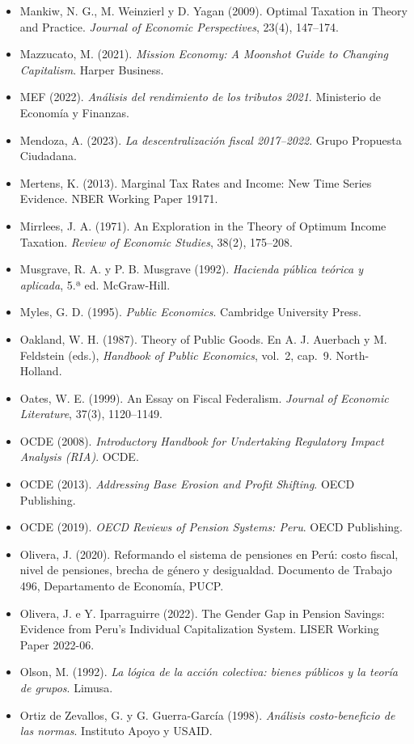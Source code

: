 \documentclass[11pt,a4paper]{article}
\begin{document}
{\begin{itemize}[leftmargin=1.4em,itemsep=1pt,label={}]
\item Mankiw, N. G., M. Weinzierl y D. Yagan (2009). Optimal Taxation in Theory and Practice. \emph{Journal of Economic Perspectives}, 23(4), 147--174.
\item Mazzucato, M. (2021). \emph{Mission Economy: A Moonshot Guide to Changing Capitalism}. Harper Business.
\item MEF (2022). \emph{Análisis del rendimiento de los tributos 2021}. Ministerio de Economía y Finanzas.
\item Mendoza, A. (2023). \emph{La descentralización fiscal 2017--2022}. Grupo Propuesta Ciudadana.
\item Mertens, K. (2013). Marginal Tax Rates and Income: New Time Series Evidence. NBER Working Paper 19171.
\item Mirrlees, J. A. (1971). An Exploration in the Theory of Optimum Income Taxation. \emph{Review of Economic Studies}, 38(2), 175--208.
\item Musgrave, R. A. y P. B. Musgrave (1992). \emph{Hacienda pública teórica y aplicada}, 5.ª ed. McGraw-Hill.
\item Myles, G. D. (1995). \emph{Public Economics}. Cambridge University Press.
\item Oakland, W. H. (1987). Theory of Public Goods. En A. J. Auerbach y M. Feldstein (eds.), \emph{Handbook of Public Economics}, vol.~2, cap.~9. North-Holland.
\item Oates, W. E. (1999). An Essay on Fiscal Federalism. \emph{Journal of Economic Literature}, 37(3), 1120--1149.
\item OCDE (2008). \emph{Introductory Handbook for Undertaking Regulatory Impact Analysis (RIA)}. OCDE.
\item OCDE (2013). \emph{Addressing Base Erosion and Profit Shifting}. OECD Publishing.
\item OCDE (2019). \emph{OECD Reviews of Pension Systems: Peru}. OECD Publishing.
\item Olivera, J. (2020). Reformando el sistema de pensiones en Perú: costo fiscal, nivel de pensiones, brecha de género y desigualdad. Documento de Trabajo 496, Departamento de Economía, PUCP.
\item Olivera, J. e Y. Iparraguirre (2022). The Gender Gap in Pension Savings: Evidence from Peru's Individual Capitalization System. LISER Working Paper 2022-06.
\item Olson, M. (1992). \emph{La lógica de la acción colectiva: bienes públicos y la teoría de grupos}. Limusa.
\item Ortiz de Zevallos, G. y G. Guerra-García (1998). \emph{Análisis costo-beneficio de las normas}. Instituto Apoyo y USAID.

\end{itemize}}
\end{document}
